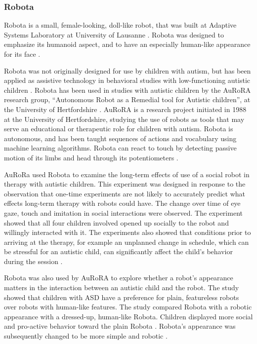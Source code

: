 \subsubsection{Robota}

Robota is a small, female-looking, doll-like robot, that was built at Adaptive Systems Laboratory at University of Lausanne \cite{billard2003robota}. Robota was designed to emphasize its humanoid aspect, and to have an especially human-like appearance for its face \cite{billard2006building}. 

Robota was not originally designed for use by children with autism, but has been applied as assistive technology in behavioral studies with low-functioning autistic children \cite{billard2006building}. Robota has been used in studies with autistic children by the AuRoRA research group, ``Autonomous Robot as a Remedial tool for Autistic children'', at the University of Hertfordshire \cite{robins2004effects, robins2006appearance}. AuRoRA is a research project initiated in 1988 at the University of Hertfordshire, studying the use of robots as tools that may serve an educational or therapeutic role for children with autism. Robota is autonomous, and has been taught sequences of actions and vocabulary using machine learning algorithms. Robota can react to touch by detecting passive motion of its limbs and head through its potentiometers \cite{robins2004effects}. 

AuRoRa used Robota to examine the long-term effects of use of a social robot in therapy with autistic children. This experiment was designed in response to the observation that one-time experiments are not likely to accurately predict what effects long-term therapy with robots could have. The change over time of eye gaze, touch and imitation in social interactions were observed. The experiment showed that all four children involved opened up socially to the robot and willingly interacted with it. The experiments also showed that conditions prior to arriving at the therapy, for example an unplanned change in schedule, which can be stressful for an autistic child, can significantly affect the child's behavior during the session \cite{robins2004effects}.

Robota was also used by AuRoRA to explore whether a robot's appearance matters in the interaction between an autistic child and the robot. The study showed that children with ASD have a preference for plain, featureless robots over robots with human-like features. The study compared Robota with a robotic appearance with a dressed-up, human-like Robota. Children displayed more social and pro-active behavior toward the plain Robota \cite{robins2006appearance}. Robota's appearance was subsequently changed to be more simple and robotic \cite{billard2006building}.


